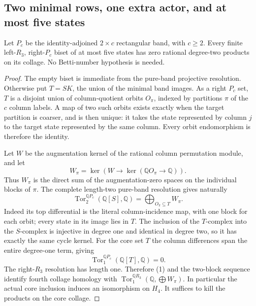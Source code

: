 \subsection{Two minimal rows, one extra actor, and at most five states}

\begin{lemma}
\label{CP2:A-pure-two-row-five-states-products}
Let $P_c$ be the identity-adjoined $2\times c$ rectangular
band, with $c\ge2$.  Every finite left-$R_3$, right-$P_c$
biset of at most five states has zero rational degree-two
products on its collage.  No Betti-number hypothesis is needed.
\end{lemma}
\begin{proof}
The empty biset is immediate from the pure-band projective
resolution.  Otherwise put $T=SK$, the union of the minimal
band images.  As a right $P_c$ set, $T$ is a disjoint union
of column-quotient orbits $O_\pi$, indexed by partitions
$\pi$ of the $c$ column labels.  A map of two such orbits
exists exactly when the target partition is coarser, and
is then unique: it takes the state represented by column
$j$ to the target state represented by the same column.
Every orbit endomorphism is therefore the identity.

Let $W$ be the augmentation kernel of the rational column
permutation module, and let
\[
 W_\pi=\ker(W\longrightarrow
            \ker(\mathbb QO_\pi\to\mathbb Q)).
\]
Thus $W_\pi$ is the direct sum of the augmentation-zero
spaces on the individual blocks of $\pi$.
The complete length-two pure-band resolution gives naturally
\[
 \operatorname{Tor}^{\mathbb QP_c}_2(\mathbb Q[S],\mathbb Q)
        =\bigoplus_{O_\pi\subseteq T} W_\pi.                 \tag{1}
\]
Indeed its top differential is the literal column-incidence
map, with one block for each orbit; every state in its
image lies in $T$.  The inclusion of the $T$-complex into
the $S$-complex is injective in degree one and identical
in degree two, so it has exactly the same cycle kernel.
For the core set $T$ the column differences span the entire
degree-one term, giving
\[
 \operatorname{Tor}^{\mathbb QP_c}_1(\mathbb Q[T],\mathbb Q)=0.
                                                               \tag{2}
\]
The right-$R_3$ resolution has length one.  Therefore (1)
and the two-block sequence identify fourth collage homology
with
$\operatorname{Tor}^{\mathbb QR_3}_1
 (\mathbb Q,\bigoplus W_\pi)$.
In particular the actual core inclusion induces an
isomorphism on $H_4$.  It suffices to kill the products
on the core collage.


\end{proof}

